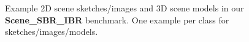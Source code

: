\begin{figure}[t]
{}
\caption{Example 2D scene sketches/images and 3D scene models in our \textbf{Scene\_SBR\_IBR} benchmark. One example per class for sketches/images/models.}
\label{BenchmarkExamples}
\end{figure}
